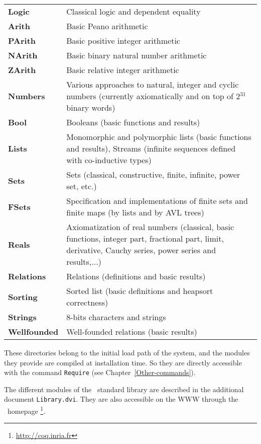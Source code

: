 \begin{tabular}{lp{12cm}}
  {\bf Logic}   & Classical logic and dependent equality \\
  {\bf Arith}   & Basic Peano arithmetic \\
  {\bf PArith}  & Basic positive integer arithmetic \\
  {\bf NArith}  & Basic binary natural number arithmetic \\
  {\bf ZArith}  & Basic relative integer arithmetic \\
  {\bf Numbers} & Various approaches to natural, integer and cyclic numbers (currently axiomatically and on top of 2$^{31}$ binary words) \\
  {\bf Bool}    & Booleans (basic functions and results) \\
  {\bf Lists}   & Monomorphic and polymorphic lists (basic functions and
            results), Streams (infinite sequences defined with co-inductive
            types) \\
  {\bf Sets}    & Sets (classical, constructive, finite, infinite, power set,
            etc.) \\
  {\bf FSets}   & Specification and implementations of finite sets and finite
                  maps (by lists and by AVL trees)\\
 {\bf Reals}    & Axiomatization of real numbers (classical, basic functions, 
                  integer part, fractional part, limit, derivative, Cauchy 
                  series, power series and results,...)\\
 {\bf Relations} & Relations (definitions and basic results) \\
 {\bf Sorting}  & Sorted list (basic definitions and heapsort correctness) \\
 {\bf Strings}  & 8-bits characters and strings\\
 {\bf Wellfounded} & Well-founded relations (basic results) \\

\end{tabular}
\medskip

These directories belong to the initial load path of the system, and
the modules they provide are compiled at installation time. So they
are directly accessible with the command \verb!Require! (see
Chapter~\ref{Other-commands}). 

The different modules of the \Coq\ standard library are described in the
additional document \verb!Library.dvi!. They are also accessible on the WWW
through the \Coq\ homepage
\footnote{\url{http://coq.inria.fr}}.

